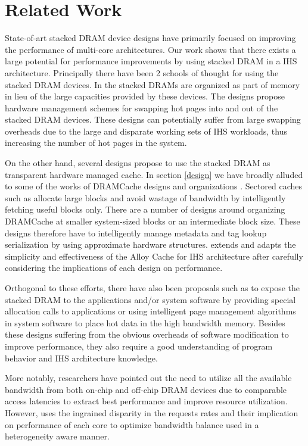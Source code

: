 \section{Related Work} \label{related-work}
State-of-art stacked DRAM device designs have primarily focused on improving the performance of multi-core architectures. Our work shows that there exists a large potential for performance improvements by using stacked DRAM in a IHS architecture. Principally there have been 2 schools of thought for using the stacked DRAM devices. In \cite{pom,cameo} the stacked DRAMs are organized as part of memory in lieu of the large capacities provided by these devices. The designs propose hardware management schemes for swapping hot pages into and out of the stacked DRAM devices. These designs can potentially suffer from large swapping overheads due to the large and disparate working sets of IHS workloads, thus increasing the number of hot pages in the system.
\par On the other hand, several designs propose to use the stacked DRAM as transparent hardware managed cache. In section \ref{design} we have broadly alluded to some of the works of DRAMCache designs and organizations \cite{alloy,atcache,bimodal,loh-hill}. Sectored caches such as \cite{footprint,unison-cache} allocate large blocks and avoid wastage of bandwidth by intelligently fetching useful blocks only. There are a number of designs around organizing DRAMCache at smaller system-sized blocks or an intermediate block size. These designs therefore have to intelligently manage metadata and tag lookup serialization by using approximate hardware structures. \cachename extends and adapts the simplicity and effectiveness of the Alloy Cache for IHS architecture after carefully considering the implications of each design on performance.
\par Orthogonal to these efforts, there have also been proposals such as \cite{software-dram} to expose the stacked DRAM to the applications and/or system software by providing special allocation calls to applications or using intelligent page management algorithms in system software to place hot data in the high bandwidth memory. Besides these designs suffering from the obvious overheads of software modification to improve performance, they also require a good understanding of program behavior and IHS architecture knowledge.
\par More notably, researchers have pointed out the need to utilize all the available bandwidth from both on-chip and off-chip DRAM devices due to comparable access latencies \cite{mostly-clean,mainak-hpca,bear} to extract best performance and improve resource utilization. However, \cachename uses the ingrained disparity in the requests rates and their implication on performance of each core to optimize bandwidth balance used in a heterogeneity aware manner. 
